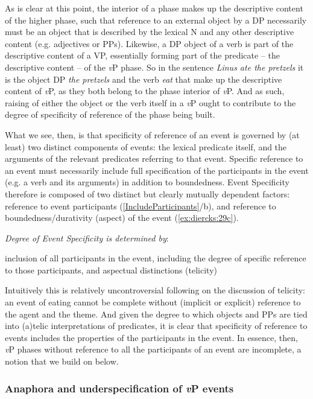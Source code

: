 \documentclass[output=paper
,modfonts
,nonflat
]{langsci/langscibook}
\begin{document}
As is clear at this point, the interior of a phase makes up the descriptive content of the higher phase, such that reference to an external object by a DP necessarily must be an object that is described by the lexical N and any other descriptive content (e.g. adjectives or PPs). Likewise, a DP object of a verb is part of the descriptive content of a VP, essentially forming part of the predicate -- the descriptive content -- of the \textit{v}P phase. So in the sentence \textit{Linus ate the pretzels} it is the object DP \textit{the pretzels} and the verb \textit{eat} that make up the descriptive content of \textit{v}P, as they both belong to the phase interior of \textit{v}P. And as such, raising of either the object or the verb itself in a \textit{v}P ought to contribute to the degree of specificity of reference of the phase being built.

What we see, then, is that specificity of reference of an event is governed by (at least) two distinct components of events: the lexical predicate itself, and the arguments of the relevant predicates referring to that event. Specific reference to an event must necessarily include full specification of the participants in the event (e.g. a verb and its arguments) in addition to boundedness. Event Specificity therefore is composed of two distinct but clearly mutually dependent factors: reference to event participants (\ref{IncludeParticipants}/b), and reference to boundedness/durativity (aspect) of the event (\ref{ex:diercks:29c}). 

\ea \textit{Degree of Event Specificity is determined by}:
\begin{xlist}
\ex inclusion of all participants in the event, including \label{IncludeParticipants}
\ex the degree of specific reference to those participants, and \label{ex:diercks:29b}
\ex aspectual distinctions (telicity)\label{ex:diercks:29c}
\end{xlist}
\z
\noindent Intuitively this is relatively uncontroversial following on the discussion of telicity: an event of eating cannot be complete without (implicit or explicit) reference to the agent and the theme. And given the degree to which objects and PPs are tied into (a)telic interpretations of predicates, it is clear that specificity of reference to events includes the properties of the participants in the event. In essence, then, \textit{v}P phases without reference to all the participants of an event are incomplete, a notion that we build on below.

\subsubsection{Anaphora and underspecification of \textit{v}P events}
\end{document}
